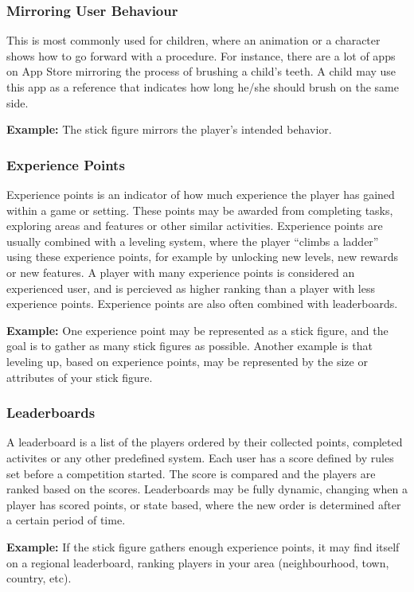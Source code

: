 \subsubsection{Mirroring User Behaviour}
\label{sec:mirroringuserbehaviour}
This is most commonly used for children, where an animation or a character shows how to go forward with a procedure. For instance, there are a lot of apps on App Store mirroring the process of brushing a child's teeth. A child may use this app as a reference that indicates how long he/she should brush on the same side.   

\textbf{Example:} The stick figure mirrors the player's intended behavior. 

\subsubsection{Experience Points}
\label{sec:experiencepoints}
Experience points is an indicator of how much experience the player has gained within a game or setting. These points may be awarded from completing tasks, exploring areas and features or other similar activities. Experience points are usually combined with a leveling system, where the player ``climbs a ladder'' using these experience points, for example by unlocking new levels, new rewards or new features. A player with many experience points is considered an experienced user, and is percieved as higher ranking than a player with less experience points. Experience points are also often combined with leaderboards. 

\textbf{Example:} One experience point may be represented as a stick figure, and the goal is to gather as many stick figures as possible. Another example is that leveling up, based on experience points, may be represented by the size or attributes of your stick figure.

\subsubsection{Leaderboards}
\label{sec:leaderboards}
A leaderboard is a list of the players ordered by their collected points, completed activites or any other predefined system. Each user has a score defined by rules set before a competition started. The score is compared and the players are ranked based on the scores. Leaderboards may be fully dynamic, changing when a player has scored points, or state based, where the new order is determined after a certain period of time.

\textbf{Example:} If the stick figure gathers enough experience points, it may find itself on a regional leaderboard, ranking players in your area (neighbourhood, town, country, etc). 

